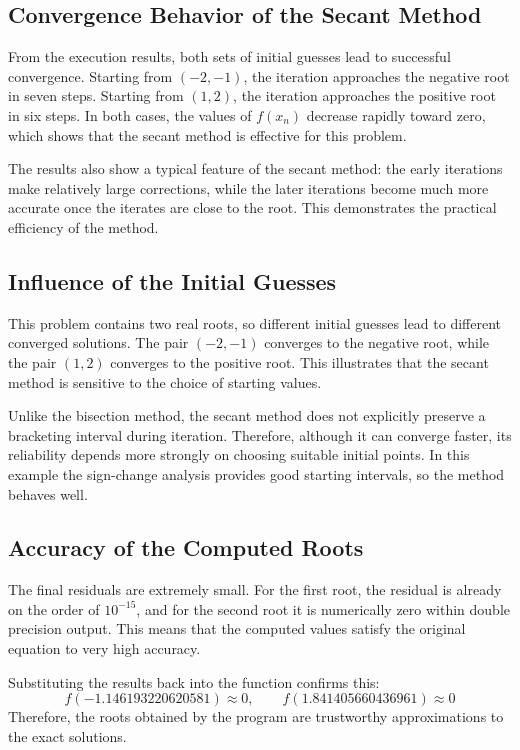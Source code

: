 \documentclass[12pt,a4paper]{article}
\begin{document}
\subsection*{Convergence Behavior of the Secant Method}

From the execution results, both sets of initial guesses lead to successful convergence. Starting from $(-2,-1)$, the iteration approaches the negative root in seven steps. Starting from $(1,2)$, the iteration approaches the positive root in six steps. In both cases, the values of $f(x_n)$ decrease rapidly toward zero, which shows that the secant method is effective for this problem.

The results also show a typical feature of the secant method: the early iterations make relatively large corrections, while the later iterations become much more accurate once the iterates are close to the root. This demonstrates the practical efficiency of the method.

\subsection*{Influence of the Initial Guesses}

This problem contains two real roots, so different initial guesses lead to different converged solutions. The pair $(-2,-1)$ converges to the negative root, while the pair $(1,2)$ converges to the positive root. This illustrates that the secant method is sensitive to the choice of starting values.

Unlike the bisection method, the secant method does not explicitly preserve a bracketing interval during iteration. Therefore, although it can converge faster, its reliability depends more strongly on choosing suitable initial points. In this example the sign-change analysis provides good starting intervals, so the method behaves well.

\subsection*{Accuracy of the Computed Roots}

The final residuals are extremely small. For the first root, the residual is already on the order of $10^{-15}$, and for the second root it is numerically zero within double precision output. This means that the computed values satisfy the original equation to very high accuracy.

Substituting the results back into the function confirms this:
\[
f(-1.146193220620581)\approx 0,
\qquad
f(1.841405660436961)\approx 0
\]
Therefore, the roots obtained by the program are trustworthy approximations to the exact solutions.
\end{document}
